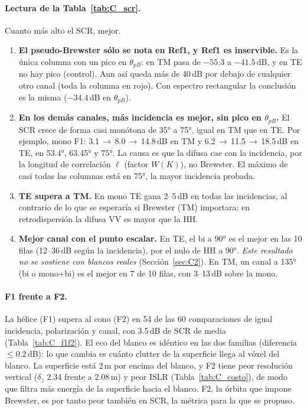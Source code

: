 \paragraph{Lectura de la Tabla~\ref{tab:C_scr}.} Cuanto más alto el SCR, mejor.
\begin{enumerate}[itemsep=3pt]
  \item \textbf{El pseudo-Brewster sólo se nota en Ref1, y Ref1 es inservible.} Es la única
  columna con un pico en $\theta_{pB}$: en TM pasa de $-55.3$ a $-41.5$\,dB, y en TE no hay pico
  (control). Aun así queda más de 40\,dB por debajo de cualquier otro canal (toda la columna en rojo).
  Con espectro rectangular la conclusión es la misma ($-34.4$\,dB en $\theta_{pB}$).
  \item \textbf{En los demás canales, más incidencia es mejor, sin pico en $\theta_{pB}$.} El SCR
  crece de forma casi monótona de 35° a 75°, igual en TM que en TE. Por ejemplo, mono F1:
  3.1\,$\to$\,8.0\,$\to$\,14.8\,dB en TM y 6.2\,$\to$\,11.5\,$\to$\,18.5\,dB en TE, en
  53.4°, 63.45° y 75°. La causa es que la difusa cae con la incidencia, por la longitud de
  correlación $\ell$ (factor $W(K)$), no Brewster. El máximo de casi todas las columnas está en
  75°, la mayor incidencia probada.
  \item \textbf{TE supera a TM.} En mono TE gana 2--5\,dB en todas las incidencias,
  al contrario de lo que se esperaría si Brewster (TM) importara: en retrodispersión la difusa
  VV es mayor que la HH.
  \item \textbf{Mejor canal con el punto escalar.} En TE, el bi a 90° es el mejor en las 10 filas
  (12--36\,dB según la incidencia), por el nulo de HH a 90°. \emph{Este resultado no se
  sostiene con blancos reales} (Sección~\ref{sec:C2}). En TM, un canal a 135° (bi o mono+bi) es el mejor en 7 de 10 filas, con 3--13\,dB
  sobre la mono.
\end{enumerate}



\paragraph{F1 frente a F2.} La hélice (F1) supera al cono (F2) en 54 de las 60 comparaciones
de igual incidencia, polarización y canal, con 3.5\,dB de SCR de media
(Tabla~\ref{tab:C_f1f2}). El eco del blanco es idéntico en las dos familias (diferencia
$\le0.2$\,dB): lo que cambia es cuánto clutter de la superficie llega al vóxel del blanco. La
superficie está 2\,m por encima del blanco, y F2 tiene peor resolución vertical
($\delta_z$ 2.34 frente a 2.08\,m) y peor ISLR (Tabla~\ref{tab:C_costo}), de modo que filtra
más energía de la superficie hacia el blanco. F2, la órbita que impone Brewster, es por tanto
peor también en SCR, la métrica para la que se propuso.

